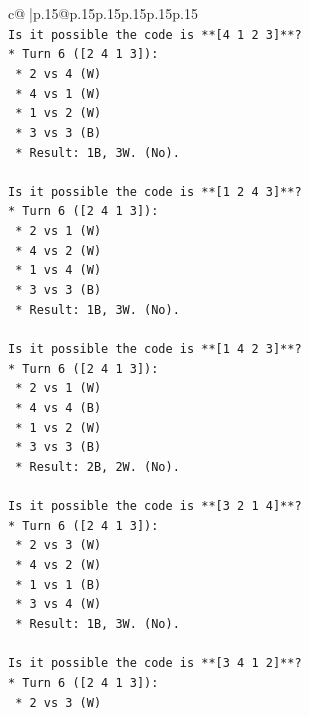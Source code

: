 \documentclass{article}
\begin{document}
{\begin{supertabular}{c@{$\;$}|p{.15\linewidth}@{}p{.15\linewidth}p{.15\linewidth}p{.15\linewidth}p{.15\linewidth}p{.15\linewidth}}
{{{\\ 
\texttt{Is it possible the code is **{[}4 1 2 3{]}**?} \\
\texttt{*   Turn 6 ({[}2 4 1 3{]}):} \\
\texttt{    *   2 vs 4 (W)} \\
\texttt{    *   4 vs 1 (W)} \\
\texttt{    *   1 vs 2 (W)} \\
\texttt{    *   3 vs 3 (B)} \\
\texttt{    *   Result: 1B, 3W. (No).} \\
\\ 
\texttt{Is it possible the code is **{[}1 2 4 3{]}**?} \\
\texttt{*   Turn 6 ({[}2 4 1 3{]}):} \\
\texttt{    *   2 vs 1 (W)} \\
\texttt{    *   4 vs 2 (W)} \\
\texttt{    *   1 vs 4 (W)} \\
\texttt{    *   3 vs 3 (B)} \\
\texttt{    *   Result: 1B, 3W. (No).} \\
\\ 
\texttt{Is it possible the code is **{[}1 4 2 3{]}**?} \\
\texttt{*   Turn 6 ({[}2 4 1 3{]}):} \\
\texttt{    *   2 vs 1 (W)} \\
\texttt{    *   4 vs 4 (B)} \\
\texttt{    *   1 vs 2 (W)} \\
\texttt{    *   3 vs 3 (B)} \\
\texttt{    *   Result: 2B, 2W. (No).} \\
\\ 
\texttt{Is it possible the code is **{[}3 2 1 4{]}**?} \\
\texttt{*   Turn 6 ({[}2 4 1 3{]}):} \\
\texttt{    *   2 vs 3 (W)} \\
\texttt{    *   4 vs 2 (W)} \\
\texttt{    *   1 vs 1 (B)} \\
\texttt{    *   3 vs 4 (W)} \\
\texttt{    *   Result: 1B, 3W. (No).} \\
\\ 
\texttt{Is it possible the code is **{[}3 4 1 2{]}**?} \\
\texttt{*   Turn 6 ({[}2 4 1 3{]}):} \\
\texttt{    *   2 vs 3 (W)} \\
}}}
\end{supertabular}}
\end{document}
